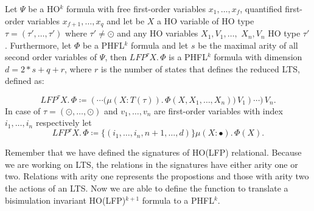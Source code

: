 \begin{definition}
Let $\Psi$ be a HO$^k$ formula with free first-order variables $x_1, \dots, x_f$, quantified first-order variables $x_{f+1}, \dots,
    x_q$ and let be $X$ a HO variable of HO type $\tau = (\tau', \dots, \tau')$ where $\tau' \neq \odot$ and any HO variables
    $X_1, V_1, \dots, $ $X_n, V_n$ HO type $\tau'$. Furthermore, let
    $\Phi$ be a PHFL$^k$
    formula and let $s$ be the maximal arity
    of all second order variables of $\Psi$, then $LFP^\tau X.\,\Phi$
    is a PHFL$^k$ formula with dimension $d = 2 * s + q + r$, where $r$ is the number of states that defines the reduced LTS,  defined as:

    \[LFP^\tau X.\,\Phi \coloneqq (\dotsb \big(\mu (X \colon T(\tau)).\,\Phi(X, X_1, \dots, X_n)\big)\,V_1)\dotsb)\,V_n.\]
    In case of $\tau = (\odot, \dots, \odot)$ and $v_1, \dots, v_n$ are first-order variables with index $i_1, \dots, i_n$ respectively let
    \[LFP^{\tau} X.\,\Phi \coloneqq \{(i_1, \dots, i_n, n + 1, \dots, d)\} \mu (X \colon \bullet).\,\Phi(X).\]
\end{definition}

Remember that we have defined the signatures of HO(LFP) relational. Because we are working on LTS, the relations in
the signatures have either arity one or two. Relations with arity one represents the propostions and those with arity
two the actions of an LTS. Now we are able to define the function to translate a bisimulation invariant HO(LFP)$^{k+1}$
formula to a PHFL$^k$.

